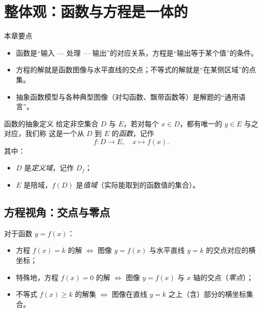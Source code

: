 \documentclass[a4paper,11pt]{ctexart}
\begin{document}
\maketitle
\tableofcontents
\fi

\section{整体观：函数与方程是一体的}

\begin{summarybox}[mathnote coverage=line]{本章要点}
  \begin{itemize}
    \item 函数是“输入 — 处理 — 输出”的对应关系，方程是“输出等于某个值”的条件。
    \item 方程的解就是函数图像与水平直线的交点；不等式的解就是“在某侧区域”的点集。
    \item 抽象函数模型与各种典型图像（对勾函数、飘带函数等）是解题的“通用语言”。
  \end{itemize}
\end{summarybox}

\begin{definitionbox}{函数的抽象定义}
  给定非空集合 $D$ 与 $E$，若对每个 $x\in D$，都有唯一的 $y\in E$ 与之对应，我们称
  这是一个从 $D$ 到 $E$ 的\emph{函数}，记作
  \[
    f\colon D\to E,\quad x\mapsto f(x).
  \]
  其中：
  \begin{itemize}
    \item $D$ 是\emph{定义域}，记作 $D_f$；
    \item $E$ 是陪域，$f(D)$ 是\emph{值域}（实际能取到的函数值的集合）。
  \end{itemize}
\end{definitionbox}

\subsection{方程视角：交点与零点}

对于函数 $y=f(x)$：

\begin{itemize}
  \item 方程 $f(x)=k$ 的解 $\Leftrightarrow$ 图像 $y=f(x)$ 与水平直线 $y=k$ 的交点对应的横坐标；
  \item 特殊地，方程 $f(x)=0$ 的解 $\Leftrightarrow$ 图像 $y=f(x)$ 与 $x$ 轴的交点（\emph{零点}）；
  \item 不等式 $f(x)\ge k$ 的解集 $\Leftrightarrow$ 图像在直线 $y=k$ 之上（含）部分的横坐标集合。
\end{itemize}
\end{document}
